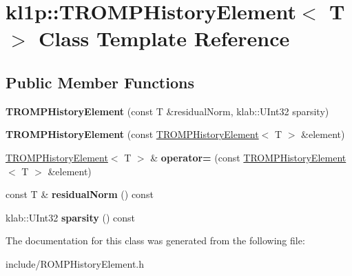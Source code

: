 \hypertarget{classkl1p_1_1TROMPHistoryElement}{}\section{kl1p\+:\+:T\+R\+O\+M\+P\+History\+Element$<$ T $>$ Class Template Reference}
\label{classkl1p_1_1TROMPHistoryElement}
\subsection*{Public Member Functions}
\begin{DoxyCompactItemize}
\item 
{\bfseries T\+R\+O\+M\+P\+History\+Element} (const T \&residual\+Norm, klab\+::\+U\+Int32 sparsity)\hypertarget{classkl1p_1_1TROMPHistoryElement_acb2b8b1aa4603fdd0ce2541cbdbe320b}{}\label{classkl1p_1_1TROMPHistoryElement_acb2b8b1aa4603fdd0ce2541cbdbe320b}

\item 
{\bfseries T\+R\+O\+M\+P\+History\+Element} (const \hyperlink{classkl1p_1_1TROMPHistoryElement}{T\+R\+O\+M\+P\+History\+Element}$<$ T $>$ \&element)\hypertarget{classkl1p_1_1TROMPHistoryElement_ab1b0480691f8b0b65e461cae037bce1f}{}\label{classkl1p_1_1TROMPHistoryElement_ab1b0480691f8b0b65e461cae037bce1f}

\item 
\hyperlink{classkl1p_1_1TROMPHistoryElement}{T\+R\+O\+M\+P\+History\+Element}$<$ T $>$ \& {\bfseries operator=} (const \hyperlink{classkl1p_1_1TROMPHistoryElement}{T\+R\+O\+M\+P\+History\+Element}$<$ T $>$ \&element)\hypertarget{classkl1p_1_1TROMPHistoryElement_a927532b40f02a98c0c20f7674f50c914}{}\label{classkl1p_1_1TROMPHistoryElement_a927532b40f02a98c0c20f7674f50c914}

\item 
const T \& {\bfseries residual\+Norm} () const \hypertarget{classkl1p_1_1TROMPHistoryElement_a9c9baa96cfae5bbe7eee73ee9a44ddaa}{}\label{classkl1p_1_1TROMPHistoryElement_a9c9baa96cfae5bbe7eee73ee9a44ddaa}

\item 
klab\+::\+U\+Int32 {\bfseries sparsity} () const \hypertarget{classkl1p_1_1TROMPHistoryElement_a085b885cac90e3c7f47096924b1b058d}{}\label{classkl1p_1_1TROMPHistoryElement_a085b885cac90e3c7f47096924b1b058d}

\end{DoxyCompactItemize}


The documentation for this class was generated from the following file\+:\begin{DoxyCompactItemize}
\item 
include/R\+O\+M\+P\+History\+Element.\+h\end{DoxyCompactItemize}
